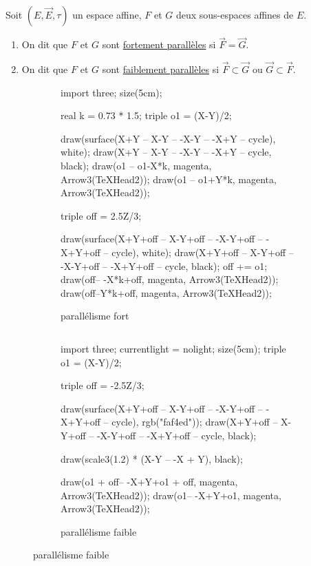\begin{defn}
	Soit $\left( E, \vec{E}, \tau \right)$ un espace affine, $F$ et $G$ deux sous-espaces affines de $E$.

	\begin{enumerate}
		\item On dit que $F$ et $G$ sont \underline{fortement parallèles} si $\vec{F} = \vec{G}$.
		\item On dit que $F$ et $G$ sont \underline{faiblement parallèles} si $\vec{F} \subset \vec{G}$ ou $\vec{G} \subset \vec{F}$.
	\end{enumerate}
\end{defn}

\begin{figure}[H]
	\centering
	\begin{subfigure}{5cm}
		\centering
		\begin{asy}
			import three;
			size(5cm);
	
			real k = 0.73 * 1.5;
			triple o1 = (X-Y)/2;

			draw(surface(X+Y -- X-Y -- -X-Y -- -X+Y -- cycle), white);
			draw(X+Y -- X-Y -- -X-Y -- -X+Y -- cycle, black);
			draw(o1 -- o1-X*k, magenta, Arrow3(TeXHead2));
			draw(o1 -- o1+Y*k, magenta, Arrow3(TeXHead2));
	

			triple off = 2.5Z/3;

			draw(surface(X+Y+off -- X-Y+off -- -X-Y+off -- -X+Y+off -- cycle), white);
			draw(X+Y+off -- X-Y+off -- -X-Y+off -- -X+Y+off -- cycle, black);
			off += o1;
			draw(off-- -X*k+off, magenta, Arrow3(TeXHead2));
			draw(off--Y*k+off, magenta, Arrow3(TeXHead2));
		\end{asy}
		\caption{parallélisme fort}
	\end{subfigure}
	$\qquad$
	\begin{subfigure}{5cm}
		\centering
		\begin{asy}
			import three;
			currentlight = nolight;
			size(5cm);
			triple o1 = (X-Y)/2;

			triple off = -2.5Z/3;

			draw(surface(X+Y+off -- X-Y+off -- -X-Y+off -- -X+Y+off -- cycle), rgb("faf4ed"));
			draw(X+Y+off -- X-Y+off -- -X-Y+off -- -X+Y+off -- cycle, black);

			draw(scale3(1.2) * (X-Y -- -X + Y), black);
	
			draw(o1 + off-- -X+Y+o1 + off, magenta, Arrow3(TeXHead2));
			draw(o1-- -X+Y+o1, magenta, Arrow3(TeXHead2));
		\end{asy}
		\caption{parallélisme faible}
	\end{subfigure}
\end{figure}

